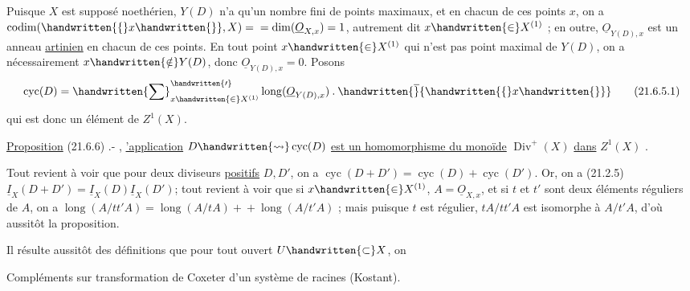 Puisque $X$ est supposé noethérien, $Y(D)$ n'a qu'un nombre fini de points maximaux, et en chacun de ces points $x$, on a $\operatorname{codim}(\handwritten{\{}x\handwritten{\}},X)={}\allowbreak{}=\operatorname{dim}(\underline O_{X,x})=1$, autrement dit $x\handwritten{\in}X^{(1)}$ ;
\normalmarginpar
{} en outre, $\underline O_{Y(D),x}$ est un anneau \uline{artinien} en chacun de ces points. En tout point $x\handwritten{\in}X^{(1)}$ qui n'est pas point maximal de $Y(D)$, on a nécessairement $x\handwritten{\notin}Y(D)$, donc $\underline O_{Y(D),x}=0$. Posons
\[
  \operatorname{cyc}(D)=\handwritten{\sum}^{\handwritten{\prime}}_{x\handwritten{\in}X^{(1)}}
  \operatorname{long}(\underline O_{Y(D),x})\mathbin{.}\handwritten{\overline}{\handwritten{\{}x\handwritten{\}}}
  \tag*{(21.6.5.1)}
\]
qui est donc un élément de $Z^{1}(X)$.

\uline{Proposition} (21.6.6) .- , \uline{'application} $D\handwritten{\leadsto}\operatorname{cyc}(D)$\deleted{\unsure{;}} \uline{est un homomorphisme du monoïde} $\operatorname{Div}^{+}(X)$ \uline{dans} $Z^{1}(X)$ .

Tout revient à voir que pour deux diviseurs \uline{positifs} $D,D'$, on a $\operatorname{cyc}(D+D')=\operatorname{cyc}(D)+\operatorname{cyc}(D')$. Or, on a (21.2.5) $\underline I_{X}(D+D')=\underline I_{X}(D)\underline I_{X}(D')$; tout revient à voir que si $x\handwritten{\in}X^{(1)}$,  $A=\underline O_{X,x}$, et si $t$ et $t'$ sont deux éléments réguliers de $A$, on a $\operatorname{long}(A/tt'A)=\operatorname{long}(A/tA)+{}\allowbreak{}+\operatorname{long}(A/t'A)$ ; mais puisque  $t$ est régulier, $tA/tt'A$ est isomorphe à $A/t'A$, d'où  aussitôt la proposition.

Il résulte aussitôt des définitions que pour tout ouvert $U\handwritten{\subset}X$, on


Compléments sur transformation de Coxeter d'un système de racines (Kostant).

